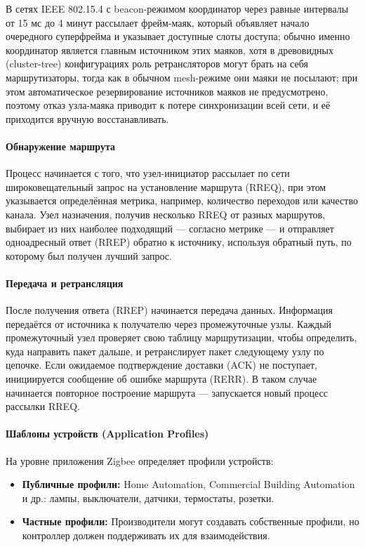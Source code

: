 \documentclass[a4paper,12pt]{article}
\begin{document}
В сетях IEEE 802.15.4 с beacon-режимом координатор через равные интервалы от 15 мс до 4 минут рассылает фрейм-маяк, который объявляет начало очередного суперфрейма и указывает доступные слоты доступа\cite{IEEE802_15_4_2020}; обычно именно координатор является главным источником этих маяков, хотя в древовидных (cluster-tree) конфигурациях роль ретрансляторов могут брать на себя маршрутизаторы, тогда как в обычном mesh-режиме они маяки не посылают; при этом автоматическое резервирование источников маяков не предусмотрено, поэтому отказ узла-маяка приводит к потере синхронизации всей сети, и её приходится вручную восстанавливать.


\paragraph{Обнаружение маршрута} Процесс начинается с того, что узел-инициатор рассылает по сети широковещательный запрос на установление маршрута (RREQ), при этом указывается определённая метрика, например, количество переходов или качество канала.
Узел назначения, получив несколько RREQ от разных маршрутов, выбирает из них наиболее подходящий — согласно метрике — и отправляет одноадресный ответ (RREP) обратно к источнику, используя обратный путь, по которому был получен лучший запрос.

\paragraph{Передача и ретрансляция} После получения ответа (RREP) начинается передача данных. Информация передаётся от источника к получателю через промежуточные узлы. Каждый промежуточный узел проверяет свою таблицу маршрутизации, чтобы определить, куда направить пакет дальше, и ретранслирует пакет следующему узлу по цепочке.
Если ожидаемое подтверждение доставки (ACK) не поступает, инициируется сообщение об ошибке маршрута (RERR). В таком случае начинается повторное построение маршрута — запускается новый процесс рассылки RREQ.


\paragraph{Шаблоны устройств (Application Profiles)}
На уровне приложения Zigbee определяет профили устройств:
\begin{itemize}
 \item \textbf{Публичные профили:} Home Automation, Commercial Building Automation и др.: лампы, выключатели, датчики, термостаты, розетки.
 \item \textbf{Частные профили:} Производители могут создавать собственные профили, но контроллер должен поддерживать их для взаимодействия.
\end{itemize}
\end{document}
